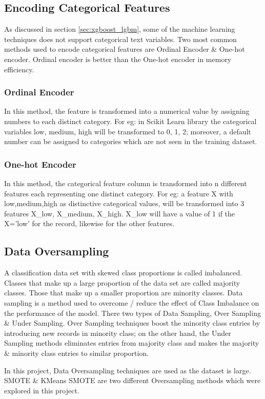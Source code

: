 \documentclass[twoside,11pt,a4paper]{article}
\begin{document}
\subsection{Encoding Categorical Features}
As discussed in section \ref{sec:xgboost_lgbm}, some of the machine learning techniques does not support categorical text variables. Two most common methods used to encode categorical features are Ordinal Encoder \& One-hot encoder. Ordinal encoder is better than the One-hot encoder in memory efficiency.
\subsubsection{Ordinal Encoder}
In this method, the feature is transformed into a numerical value by assigning numbers to each distinct category. For eg: in Scikit Learn library the categorical variables low, medium, high will be transformed to 0, 1, 2; moreover, a default number can be assigned to categories which are not seen in the training dataset. 
\subsubsection{One-hot Encoder}
In this method, the categorical feature column is transformed into n different features each representing one distinct category. For eg: a feature X with low,medium,high as distinctive categorical values, will be transformed into 3 features X\_low, X\_medium, X\_high. X\_low will have a value of 1 if the X='low' for the record, likewise for the other features.
\subsection{Data Oversampling}
A classification data set with skewed class proportions is called imbalanced. Classes that make up a large proportion of the data set are called majority classes. Those that make up a smaller proportion are minority classes. Data sampling is a method used to overcome / reduce the effect of Class Imbalance on the performance of the model. There two types of Data Sampling, Over Sampling \& Under Sampling. Over Sampling techniques boost the minority class entries by introducing new records in minority class; on the other hand, the Under Sampling methods eliminates entries from majority class and makes the majority \& minority class entries to similar proportion.

In this project, Data Oversampling techniques are used as the dataset is large. \acf{SMOTE} \citep{chawla2002smote} \&  KMeans \acs{SMOTE} \citep{last2017oversampling} are two different Oversampling methods which were explored in this project.
\end{document}
